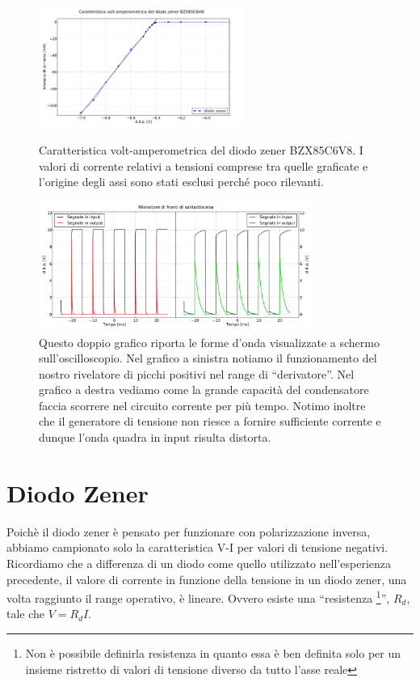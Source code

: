 \begin{figure}
\centering
	\caption{Caratteristica volt-amperometrica del diodo zener BZX85C6V8. I valori di corrente relativi a tensioni comprese tra quelle graficate e l'origine degli assi sono stati esclusi perché poco rilevanti.}
	\includegraphics[width=0.6\textwidth]{VI_zener.pdf}
	\label{fig:VI_zener}
\end{figure}

\begin{figure}[H]
\center
	\includegraphics[width=0.80\textwidth]{peaks(2).pdf}
	\caption{Questo doppio grafico riporta le forme d'onda visualizzate a schermo sull'oscilloscopio. Nel grafico a sinistra notiamo il funzionamento del nostro rivelatore di picchi positivi nel range di ``derivatore''. Nel grafico a destra vediamo come la grande capacità del condensatore faccia scorrere nel circuito corrente per più tempo. Notimo inoltre che il generatore di tensione non riesce a fornire sufficiente corrente e dunque l'onda quadra in input risulta distorta.}
	\label{fig:peaks}
\end{figure}

\section{Diodo Zener}

Poichè il diodo zener è pensato per funzionare con polarizzazione inversa, abbiamo campionato solo la caratteristica V-I per valori di tensione negativi. Ricordiamo che a differenza di un diodo come quello utilizzato nell'esperienza precedente, il valore di corrente in funzione della tensione in un diodo zener, una volta raggiunto il range operativo, è lineare. Ovvero esiste una ``resistenza \footnote{Non è possibile definirla resistenza in quanto essa è ben definita solo per un insieme ristretto di valori di tensione diverso da tutto l'asse reale}'', $R_d$, tale che $V=R_d I$.

